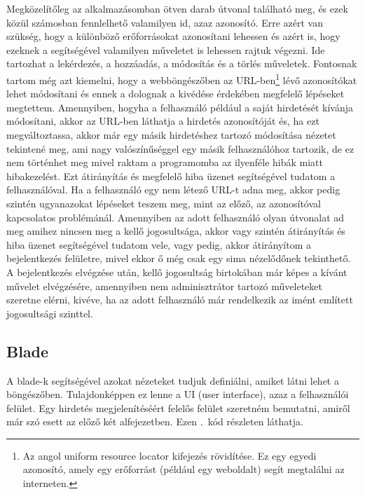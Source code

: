 \documentclass[]{thesis-ekf}
\theoremstyle{definition}
\theoremstyle{remark}
\begin{document}
		Megközelítőleg az alkalmazásomban ötven darab útvonal található meg, és ezek közül számosban fennlelhető valamilyen id, azaz azonosító. Erre azért van szükség, hogy a különböző erőforrásokat azonosítani lehessen és azért is, hogy ezeknek a segítségével valamilyen műveletet is lehessen rajtuk végezni. Ide tartozhat a lekérdezés, a hozzáadás, a módosítás és a törlés műveletek. Fontosnak tartom még azt kiemelni, hogy a webböngészőben az URL-ben\footnote{Az angol uniform resource locator kifejezés rövidítése. Ez egy egyedi azonosító, amely egy erőforrást (például egy weboldalt) segít megtalálni az interneten.} lévő azonosítókat lehet módosítani és ennek a dolognak a kivédése érdekében megfelelő lépéseket megtettem. Amennyiben, hogyha a felhasználó például a saját hirdetését kívánja módosítani, akkor az URL-ben láthatja a hirdetés azonosítóját és, ha ezt megváltoztassa, akkor már egy másik hirdetéshez tartozó módosítása nézetet tekintené meg, ami nagy valószínűséggel egy másik felhasználóhoz tartozik, de ez nem történhet meg mivel raktam a programomba az ilyenféle hibák miatt hibakezelést. Ezt átirányítás és megfelelő hiba üzenet segítségével tudatom a felhasználóval. Ha a felhasználó egy nem létező URL-t adna meg, akkor pedig szintén ugyanazokat lépéseket teszem meg, mint az előző, az azonosítóval kapcsolatos problémánál. Amennyiben az adott felhasználó olyan útvonalat ad meg amihez nincsen meg a kellő jogosultsága, akkor vagy szintén átirányítás és hiba üzenet segítségével tudatom vele, vagy pedig, akkor átirányítom a bejelentkezés felületre, mivel ekkor ő még csak egy sima nézelődőnek tekinthető. A bejelentkezés elvégzése után, kellő jogosultság birtokában már képes a kívánt művelet elvégzésére, amennyiben nem adminisztrátor tartozó műveleteket szeretne elérni, kivéve, ha az adott felhasználó már rendelkezik az imént említett jogosultsági szinttel.
	
	\subsection{Blade}\label{sc-blade}
		A blade-k segítségével azokat nézeteket tudjuk definiálni, amiket látni lehet a böngészőben. Tulajdonképpen ez lenne a UI (user interface), azaz a felhasználói felület. Egy hirdetés megjelenítéséért felelős felület szeretném bemutatni, amiről már szó esett az előző két alfejezetben. Ezen .~kód részleten láthatja.
		
		
	
\end{document}

